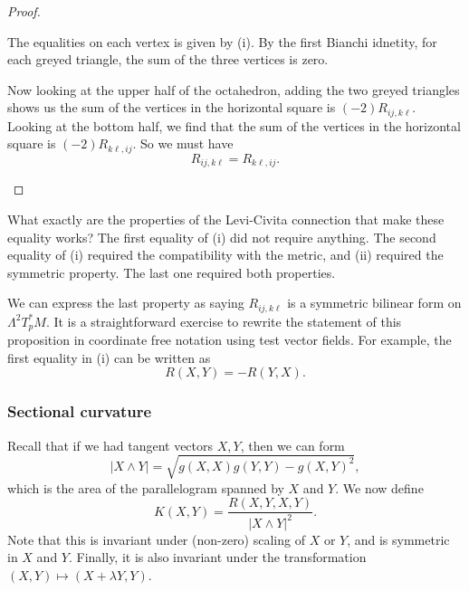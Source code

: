 \documentclass[a4paper]{article}
\begin{document}
\begin{proof}
\begin{enumerate}
\begin{center}
      \end{center}
      The equalities on each vertex is given by (i). By the first Bianchi idnetity, for each greyed triangle, the sum of the three vertices is zero.

      Now looking at the upper half of the octahedron, adding the two greyed triangles shows us the sum of the vertices in the horizontal square is $(-2) R_{ij, k\ell}$. Looking at the bottom half, we find that the sum of the vertices in the horizontal square is $(-2)R_{k\ell, ij}$. So we must have
      \[
        R_{ij, k\ell} = R_{k\ell, ij}.
      \]
  \end{enumerate}
\end{proof}
What exactly are the properties of the Levi-Civita connection that make these equality works? The first equality of (i) did not require anything. The second equality of (i) required the compatibility with the metric, and (ii) required the symmetric property. The last one required both properties.

We can express the last property as saying $R_{ij, k\ell}$ is a symmetric bilinear form on $\Lambda^2 T_p^*M$. It is a straightforward exercise to rewrite the statement of this proposition in coordinate free notation using test vector fields. For example, the first equality in (i) can be written as
\[
  R(X, Y) = -R(Y, X).
\]
\subsubsection*{Sectional curvature}
Recall that if we had tangent vectors $X, Y$, then we can form
\[
  |X \wedge Y| = \sqrt{g(X, X)g(Y, Y) - g(X, Y)^2},
\]
which is the area of the parallelogram spanned by $X$ and $Y$. We now define
\[
  K(X, Y) = \frac{R(X, Y, X, Y)}{|X \wedge Y|^2}.
\]
Note that this is invariant under (non-zero) scaling of $X$ or $Y$, and is symmetric in $X$ and $Y$. Finally, it is also invariant under the transformation $(X, Y) \mapsto (X + \lambda Y, Y)$.
\end{document}
